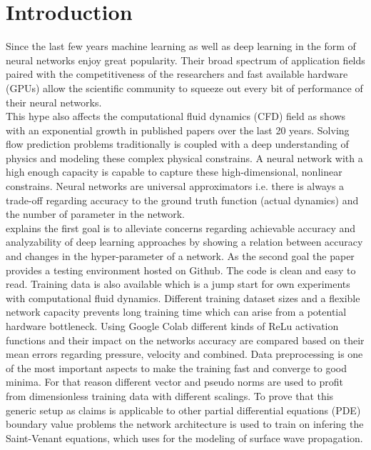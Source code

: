 \documentclass[acmtog]{techreportacmart}
\begin{document}
\section{Introduction}
Since the last few years machine learning as well as deep learning in the form 
of neural networks enjoy great popularity. Their broad spectrum of application 
fields paired with the competitiveness of the researchers and fast available hardware (GPUs) 
allow the scientific community to squeeze out every bit of performance of their 
neural networks. \\
This hype also affects the computational fluid dynamics (CFD) field as \cite{viquerat2019}
shows with an exponential growth in published papers over the last 20 years.
Solving flow prediction problems traditionally is coupled with a deep understanding 
of physics and modeling these complex physical constrains. A neural network with a 
high enough capacity is capable to capture these high-dimensional, nonlinear constrains.
Neural networks are universal approximators \cite{Approximation} i.e. there is always a
trade-off regarding accuracy to the ground truth function (actual dynamics) and the 
number of parameter in the network. \\
\cite{Thuerey20} explains the first goal is to alleviate concerns regarding achievable accuracy
and analyzability of deep learning approaches by showing a relation between accuracy and
changes in the  hyper-parameter of a network.
As the second goal the paper provides a testing environment hosted on Github. 
The code is clean and easy to read. Training data is also available which is 
a jump start for own experiments with computational fluid dynamics. Different training
dataset sizes and a flexible network capacity prevents long training time which can arise
from a potential hardware bottleneck. Using Google Colab different kinds of ReLu activation functions and their impact on the networks accuracy are compared based on their mean errors regarding pressure, velocity and combined. Data preprocessing is one of the most important aspects to make the training fast and converge to good minima. For that reason different vector and pseudo norms are used to profit from dimensionless training data with different scalings. To prove that this generic setup as \cite{Thuerey20} claims is applicable to other partial differential equations (PDE) boundary value problems the network architecture is used to train on infering the Saint-Venant equations, which \cite{Fotiadis2020} uses for the modeling of surface wave propagation.
\end{document}
